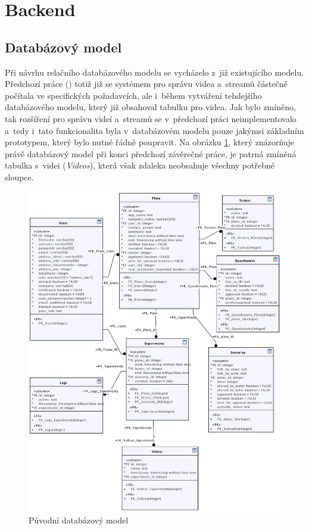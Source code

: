 \documentclass[thesis=M,czech]{FITthesis}[2012/06/26]
\begin{document}
\section{Backend} \label{sec:navrh_backend}
\subsection{Databázový model} \label{subsec:navrh_backend_databaze}
Při návrhu relačního databázového modelu se vycházelo z~již existujícího modelu. Předchozí práce (\cite{solankar}) totiž již se systémem pro správu videa a~streamů částečně počítala ve specifických požadavcích, ale i~během vytváření tehdejšího databázového modelu, který již obsahoval tabulku pro videa. Jak bylo zmíněno, tak rozšíření pro správu videí a~streamů se v~předchozí práci neimplementovalo a~tedy i~tato funkcionalita byla v~databázovém modelu pouze jakýmsi základním prototypem, který bylo nutné řádně poupravit. Na obrázku \ref{img:navrh_backend_db_orig}, který znázorňuje právě databázový model při konci předchozí závěrečné práce, je patrná zmíněná tabulka s~videi (\textit{Videos}), která však zdaleka neobsahuje všechny potřebné sloupce.
\\
\begin{figure}[h]\centering
	\includegraphics[width=1\textwidth]{images/db_orig.eps}
	\caption{Původní databázový model}\label{img:navrh_backend_db_orig}
\end{figure}
\end{document}
